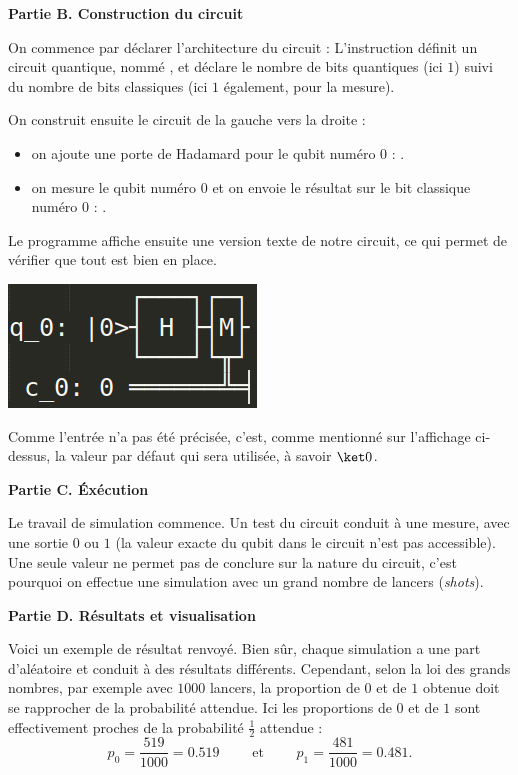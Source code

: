 \documentclass[11pt,class=report,crop=false]{standalone}
\begin{document}
\bigskip
\textbf{Partie B. Construction du circuit}

On commence par déclarer l'architecture du circuit :
L'instruction définit un circuit quantique, nommé , et déclare le nombre de bits quantiques (ici $1$) suivi du nombre de bits classiques (ici $1$ également, pour la mesure).

On construit ensuite le circuit de la gauche vers la droite :
\begin{itemize}
  \item on ajoute une porte  de Hadamard pour le qubit numéro $0$ : .
  \item on mesure le qubit numéro $0$ et on envoie le résultat sur le bit classique numéro $0$ : .
\end{itemize}

Le programme affiche ensuite une version texte de notre circuit, ce qui permet de vérifier que tout est bien en place. 
\begin{center}
\includegraphics[scale=\myscale,scale=0.5]{figures/fig-circuit-texte}
\end{center}
Comme l'entrée n'a pas été précisée, c'est, comme mentionné sur l'affichage ci-dessus, la valeur par défaut qui sera utilisée, à savoir $\ket0$.

\bigskip
\textbf{Partie C. \'Exécution}

Le travail de simulation commence. 
Un test du circuit conduit à une mesure, avec une sortie $0$ ou $1$  (la valeur exacte du qubit dans le circuit n'est pas accessible). Une seule valeur ne permet pas de conclure sur la nature du circuit, c'est pourquoi on effectue une simulation avec un grand nombre de lancers (\emph{shots}). 





\bigskip
\textbf{Partie D. Résultats et visualisation}

Voici un exemple de résultat renvoyé.
Bien sûr, chaque simulation a une part d'aléatoire et conduit à des résultats différents.
Cependant, selon la loi des grands nombres, par exemple avec $1000$ lancers, la proportion de $0$ et de $1$ obtenue doit se rapprocher de la probabilité attendue.
Ici les proportions de $0$ et de $1$ sont effectivement proches de la probabilité $\frac12$ attendue :
$$p_0 = \frac{519}{1000}=0.519 \qquad \text{ et } \qquad p_1 = \frac{481}{1000} = 0.481.$$
\end{document}

